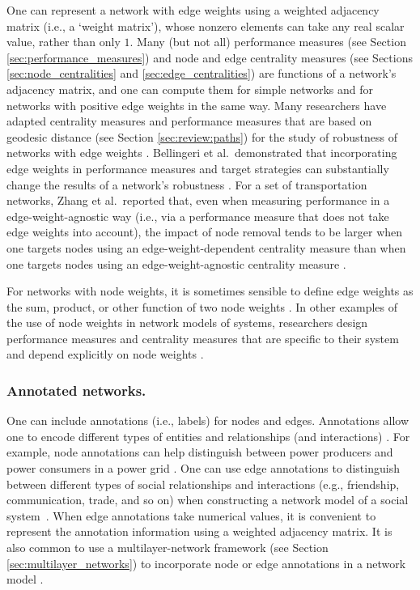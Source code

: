 \documentclass{comnet-mod}
\begin{document}
One can represent a network with edge weights using a weighted adjacency matrix (i.e., a `weight matrix'), whose nonzero elements can take any real scalar value, rather than only $1$. Many (but not all) performance measures (see Section \ref{sec:performance_measures}) and node and edge centrality measures (see Sections \ref{sec:node_centralities} and \ref{sec:edge_centralities}) are functions of a network's adjacency matrix, and one can compute them for simple networks and for networks with positive edge weights in the same way. Many researchers have adapted centrality measures and performance measures that are based on geodesic distance (see Section \ref{sec:review:paths}) for the study of robustness of networks with edge weights \cite{Zhang2013b, Zhang2013b, Bellingeri2018, Zhou2019a, Zhang2021, Qian2022, Zheng2022}. Bellingeri et al.~demonstrated that incorporating edge weights in performance measures and target strategies can substantially change the results of a network's robustness \cite{Bellingeri2018}. For a set of transportation networks, Zhang et al.~reported that, even when measuring performance in a edge-weight-agnostic way (i.e., via a performance measure that does not take edge weights into account), the impact of node removal tends to be larger when one targets nodes using an edge-weight-dependent centrality measure than when one targets nodes using an edge-weight-agnostic centrality measure \cite{Zhang2021}.

For networks with node weights, it is sometimes sensible to define edge weights as the sum, product, or other function of two node weights \cite{Ravichandran2019}. In other examples of the use of node weights in network models of systems, researchers design performance measures and centrality measures that are specific to their system and depend explicitly on node weights \cite{Phillips2012, Gou2017, Mourier2017, Matakos2020}.


\subsubsection{Annotated networks.}\label{sec:anno}

One can include annotations (i.e., labels) for nodes and edges. Annotations allow one to encode different types of entities and relationships (and interactions) \cite{faust1994, Light2020}. For example, node annotations can help distinguish between power producers and power consumers in a power grid \cite{Albert2004}. One can use edge annotations to distinguish between different types of social relationships and interactions (e.g., friendship, communication, trade, and so on) when constructing a network model of a social system~\cite{faust1994}. When edge annotations take numerical values, it is convenient to represent the annotation information using a weighted adjacency matrix. It is also common to use a multilayer-network framework (see Section \ref{sec:multilayer_networks}) to incorporate node or edge annotations in a network model \cite{Kivela2014}.
\end{document}
